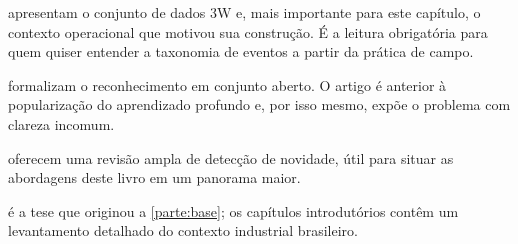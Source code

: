 \begin{leituras}
\item \citet{VARGAS2019} apresentam o conjunto de dados 3W e, mais importante para este
      capítulo, o contexto operacional que motivou sua construção. É a leitura
      obrigatória para quem quiser entender a taxonomia de eventos a partir da prática
      de campo.
\item \citet{Scheirer2013} formalizam o reconhecimento em conjunto aberto. O artigo é
      anterior à popularização do aprendizado profundo e, por isso mesmo, expõe o
      problema com clareza incomum.
\item \citet{Pimentel2014review} oferecem uma revisão ampla de detecção de novidade,
      útil para situar as abordagens deste livro em um panorama maior.
\item \citet{LopesTese2025} é a tese que originou a \cref{parte:base}; os capítulos
      introdutórios contêm um levantamento detalhado do contexto industrial brasileiro.
\end{leituras}
